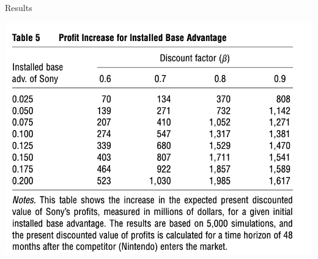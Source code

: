 \documentclass[aspectratio=169,11pt]{beamer}
\begin{document}
\begin{frame}{Results}
\begin{center}
\includegraphics[scale=0.75]{resources/dube-table5}
\end{center}
\end{frame}
\end{document}
